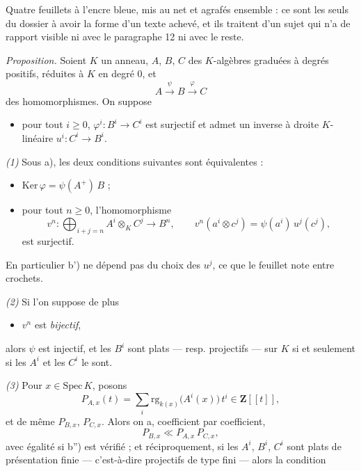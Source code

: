 \documentclass[11pt,a4paper]{article}
\begin{document}
Quatre feuillets à l'encre bleue, mis au net et agrafés ensemble : ce sont les
seuls du dossier à avoir la forme d'un texte achevé, et ils traitent d'un sujet
qui n'a de rapport visible ni avec le paragraphe 12 ni avec le reste.

\emph{Proposition.} Soient $K$ un anneau, $A$, $B$, $C$ des $K$-algèbres
graduées à degrés positifs, réduites à $K$ en degré $0$, et
\[
  A \xrightarrow{\;\psi\;} B \xrightarrow{\;\varphi\;} C
\]
des homomorphismes. On suppose

\begin{itemize}
  \item[a)] pour tout $i \geqslant 0$, $\varphi^{i} : B^{i} \to C^{i}$ est
  surjectif et admet un inverse à droite $K$-linéaire $u^{i} : C^{i} \to B^{i}$.
\end{itemize}

\emph{(1)} Sous a), les deux conditions suivantes sont équivalentes :

\begin{itemize}
  \item[b)] $\mathrm{Ker}\,\varphi = \psi(A^{+})\,B$ ;
  \item[b')] pour tout $n \geqslant 0$, l'homomorphisme
  \[
    v^{n} : \bigoplus_{i+j=n} A^{i} \otimes_{K} C^{j} \longrightarrow B^{n} ,
    \qquad v^{n}(a^{i} \otimes c^{j}) = \psi(a^{i})\, u^{j}(c^{j}) ,
  \]
  est surjectif.
\end{itemize}

En particulier b') ne dépend pas du choix des $u^{j}$, ce que le feuillet note
entre crochets.

\emph{(2)} Si l'on suppose de plus

\begin{itemize}
  \item[b'')] $v^{n}$ est \emph{bijectif},
\end{itemize}

alors $\psi$ est injectif, et les $B^{i}$ sont plats — resp. projectifs — sur
$K$ si et seulement si les $A^{i}$ et les $C^{i}$ le sont.

\emph{(3)} Pour $x \in \mathrm{Spec}\,K$, posons
\[
  P_{A,x}(t) = \sum_{i} \mathrm{rg}_{k(x)}\bigl(A^{i}(x)\bigr)\, t^{i}
  \in \mathbf{Z}[[t]] ,
\]
et de même $P_{B,x}$, $P_{C,x}$. Alors on a, coefficient par coefficient,
\[
  P_{B,x} \ll P_{A,x}\, P_{C,x} ,
  \tag{$*$}
\]
avec égalité si b'') est vérifié ; et réciproquement, si les $A^{i}$, $B^{i}$,
$C^{i}$ sont plats de présentation finie — c'est-à-dire projectifs de type fini
— alors la condition
\end{document}
